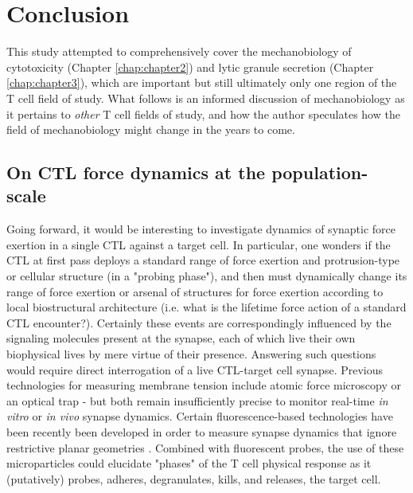 \section{Conclusion}

This study attempted to comprehensively cover the mechanobiology of cytotoxicity (Chapter \ref{chap:chapter2}) and lytic granule secretion (Chapter \ref{chap:chapter3}), which are important but still ultimately only one region of the T cell field of study. What follows is an informed discussion of mechanobiology as it pertains to \textit{other} T cell fields of study,  and how the author speculates how the field of mechanobiology might change in the years to come.

\subsection{On CTL force dynamics at the population-scale}

Going forward, it would be interesting to investigate dynamics of synaptic force exertion in a single CTL against a target cell. In particular, one wonders if the CTL at first pass deploys a standard range of force exertion and protrusion-type or cellular structure (in a "probing phase"), and then must dynamically change its range of force exertion or arsenal of structures for force exertion according to local biostructural architecture (i.e. what is the lifetime force action of a standard CTL encounter?). Certainly these events are correspondingly influenced by the signaling molecules present at the synapse, each of which live their own biophysical lives by mere virtue of their presence. Answering such questions would require direct interrogation of a live CTL-target cell synapse. Previous technologies for measuring membrane tension include atomic force microscopy or an optical trap - but both remain insufficiently precise to monitor real-time \textit{in vitro} or \textit{in vivo} synapse dynamics. Certain fluorescence-based technologies have been recently been developed in order to measure synapse dynamics that ignore restrictive planar geometries \cite{Vorselen2020}. Combined with fluorescent probes, the use of these microparticles could elucidate "phases" of the T cell physical response as it (putatively) probes, adheres, degranulates, kills, and releases, the target cell.

